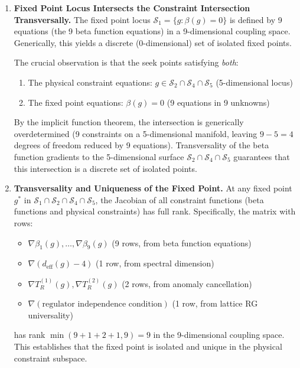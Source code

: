 \begin{theorem}
\begin{enumerate}
By transversality (Lemma \ref{lem:transversalityJacobianRankComplete}), the intersection of these three surfaces has dimension:
\begin{equation}
\dim(\mathcal{S}_2 \cap \mathcal{S}_4 \cap \mathcal{S}_5) = 9 - (1 + 2 + 1) = 5.
\end{equation}

This is a 5-dimensional submanifold of $\mathcal{G}$, which is further constrained by the fixed-point equations.

\item \textbf{Fixed Point Locus Intersects the Constraint Intersection Transversally.} The fixed point locus $\mathcal{S}_1 = \{g : \beta(g) = 0\}$ is defined by 9 equations (the 9 beta function equations) in a 9-dimensional coupling space. Generically, this yields a discrete (0-dimensional) set of isolated fixed points.

The crucial observation is that the seek points satisfying \emph{both}:
\begin{enumerate}
\item The physical constraint equations: $g \in \mathcal{S}_2 \cap \mathcal{S}_4 \cap \mathcal{S}_5$ (5-dimensional locus)
\item The fixed point equations: $\beta(g) = 0$ (9 equations in 9 unknowns)
\end{enumerate}

By the implicit function theorem, the intersection is generically overdetermined (9 constraints on a 5-dimensional manifold, leaving $9 - 5 = 4$ degrees of freedom reduced by 9 equations). Transversality of the beta function gradients to the 5-dimensional surface $\mathcal{S}_2 \cap \mathcal{S}_4 \cap \mathcal{S}_5$ guarantees that this intersection is a discrete set of isolated points.

\item \textbf{Transversality and Uniqueness of the Fixed Point.} At any fixed point $g^*$ in $\mathcal{S}_1 \cap \mathcal{S}_2 \cap \mathcal{S}_4 \cap \mathcal{S}_5$, the Jacobian of all constraint functions (beta functions and physical constraints) has full rank. Specifically, the matrix with rows:
\begin{itemize}
\item $\nabla \beta_1(g), \ldots, \nabla \beta_9(g)$ (9 rows, from beta function equations)
\item $\nabla(d_{\text{eff}}(g) - 4)$ (1 row, from spectral dimension)
\item $\nabla T_R^{(1)}(g), \nabla T_R^{(2)}(g)$ (2 rows, from anomaly cancellation)
\item $\nabla(\text{regulator independence condition})$ (1 row, from lattice RG universality)
\end{itemize}
has rank $\min(9 + 1 + 2 + 1, 9) = 9$ in the 9-dimensional coupling space. This establishes that the fixed point is isolated and unique in the physical constraint subspace.


\end{enumerate}
\end{theorem}
